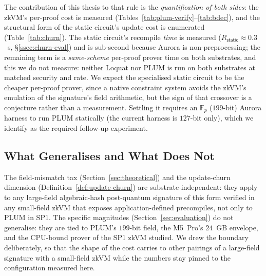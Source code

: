 \noindent The contribution of this thesis to that rule is the \emph{quantification of both sides}: the zkVM's per-proof cost is measured (Tables~\ref{tab:plum-verify}--\ref{tab:bdec}), and the structural form of the static circuit's update cost is enumerated (Table~\ref{tab:churn}). The static circuit's recompile \emph{time} is measured ($R_{\mathsf{static}}\approx 0.3$~s, \S\ref{ssec:churn-eval}) and is sub-second because Aurora is non-preprocessing; the remaining term is a \emph{same-scheme} per-proof prover time on both substrates, and this we do not measure: neither Loquat nor PLUM is run on both substrates at matched security and rate. We expect the specialised static circuit to be the cheaper per-proof prover, since a native constraint system avoids the zkVM's emulation of the signature's field arithmetic, but the sign of that crossover is a conjecture rather than a measurement. Settling it requires an $\mathbb{F}_p$ ($199$-bit) Aurora harness to run PLUM statically (the current harness is $127$-bit only), which we identify as the required follow-up experiment.

\subsection{What Generalises and What Does Not}\label{ssec:generalise}
The field-mismatch tax (Section~\ref{sec:theoretical}) and the update-churn dimension (Definition~\ref{def:update-churn}) are substrate-independent: they apply to any large-field algebraic-hash post-quantum signature of this form verified in any small-field zkVM that exposes application-defined precompiles, not only to PLUM in SP1. The specific magnitudes (Section~\ref{sec:evaluation}) do not generalise: they are tied to PLUM's $199$-bit field, the M5~Pro's $24$~GB envelope, and the CPU-bound prover of the SP1 zkVM studied. We drew the boundary deliberately, so that the shape of the cost carries to other pairings of a large-field signature with a small-field zkVM while the numbers stay pinned to the configuration measured here.

